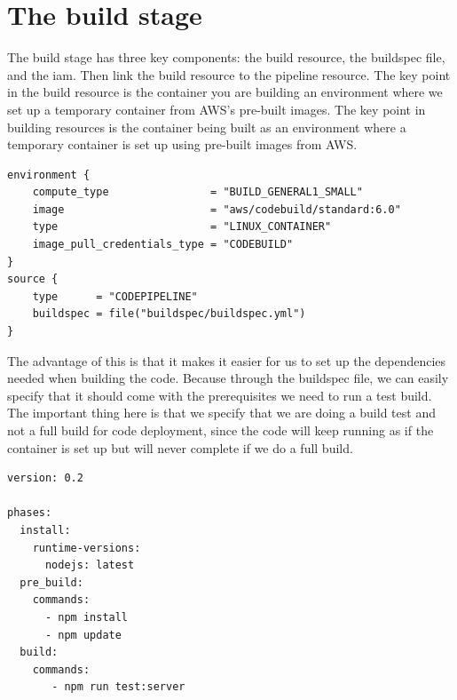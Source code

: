 \section{The build stage}
The build stage has three key components: the build resource, the \gls{buildspec} file, and the \acrshort{iam}. Then link the build resource to the pipeline resource. The key point in the build resource is the container you are building an environment where we set up a temporary container from AWS's pre-built images. The key point in building resources is the container being built as an environment where a temporary container is set up using pre-built images from AWS. 


\begin{tcolorbox}
\begin{verbatim}  
environment {
    compute_type                = "BUILD_GENERAL1_SMALL"
    image                       = "aws/codebuild/standard:6.0"
    type                        = "LINUX_CONTAINER"
    image_pull_credentials_type = "CODEBUILD"
}
source {
    type      = "CODEPIPELINE"
    buildspec = file("buildspec/buildspec.yml")
}
\end{verbatim}
\end{tcolorbox}

The advantage of this is that it makes it easier for us to set up the dependencies needed when building the code. Because through the \gls{buildspec} file, we can easily specify that it should come with the prerequisites we need to run a test build. The important thing here is that we specify that we are doing a build test and not a full build for code deployment, since the code will keep running as if the container is set up but will never complete if we do a full build.
\begin{tcolorbox}
\begin{verbatim}
version: 0.2

phases:
  install:
    runtime-versions:
      nodejs: latest
  pre_build:
    commands:
      - npm install
      - npm update
  build:
    commands:
       - npm run test:server
\end{verbatim}
\end{tcolorbox}


